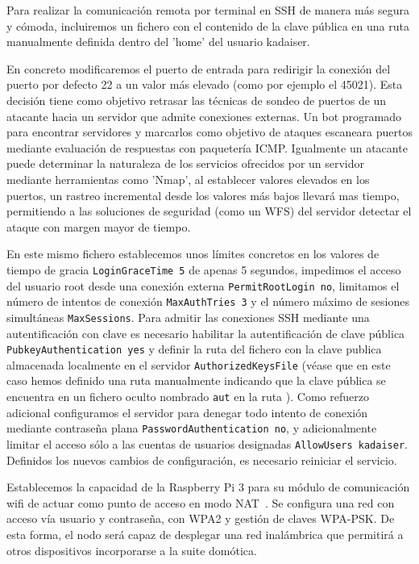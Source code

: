 Para realizar la comunicación remota por terminal en SSH de manera más segura y cómoda, incluiremos un fichero con el contenido de la clave pública en una ruta manualmente definida dentro del 'home' del usuario kadaiser.

En concreto modificaremos el puerto de entrada para redirigir la conexión del puerto por defecto 22 a un valor más elevado (como por ejemplo el 45021). Esta decisión tiene como objetivo retrasar las técnicas de sondeo de puertos de un atacante hacia un servidor que admite conexiones externas. Un bot programado para encontrar servidores y marcarlos como objetivo de ataques escaneara puertos mediante evaluación de respuestas con paquetería ICMP. Igualmente un atacante puede determinar la naturaleza de los servicios ofrecidos por un servidor mediante herramientas como 'Nmap', al establecer valores elevados en los puertos, un rastreo incremental desde los valores más bajos llevará mas tiempo, permitiendo a las soluciones de seguridad (como un WFS) del servidor detectar el ataque con margen mayor de tiempo.

En este mismo fichero establecemos unos límites concretos en los valores de tiempo de gracia \verb|LoginGraceTime 5| de apenas 5 segundos, impedimos el acceso del usuario root desde una conexión externa \verb|PermitRootLogin no|, limitamos el número de intentos de conexión \verb|MaxAuthTries 3| y el número máximo de sesiones simultáneas \verb|MaxSessions|. Para admitir las conexiones SSH mediante una autentificación con clave es necesario habilitar la autentificación de clave pública \verb|PubkeyAuthentication yes| y definir la ruta del fichero con la clave publica almacenada localmente en el servidor \verb|AuthorizedKeysFile|  (véase que en este caso hemos definido una ruta manualmente indicando que la clave pública se encuentra en un fichero oculto nombrado \verb|aut| en la ruta ). Como refuerzo adicional configuramos el servidor para denegar todo intento de conexión mediante contraseña plana \verb|PasswordAuthentication no|, y adicionalmente limitar el acceso sólo a las cuentas de usuarios designadas \verb|AllowUsers kadaiser|. Definidos los nuevos cambios de configuración, es necesario reiniciar el servicio.

Establecemos la capacidad de la Raspberry Pi 3 para su módulo de comunicación wifi de actuar como punto de acceso en modo NAT~\cite{raspberrypiasaccesspoint}. Se configura una red con acceso vía usuario y contraseña, con WPA2 y gestión de claves WPA-PSK. De esta forma, el nodo será capaz de desplegar una red inalámbrica que permitirá a otros dispositivos incorporarse a la suite domótica.

